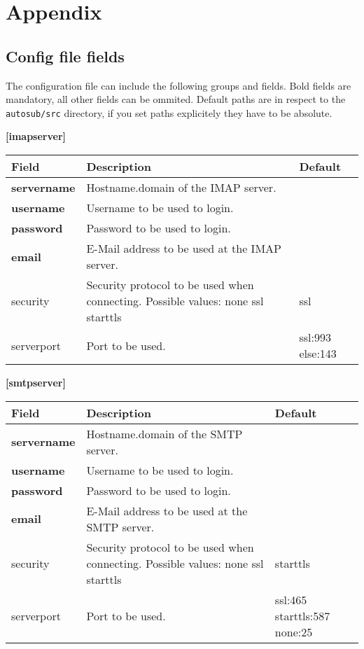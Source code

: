 \section{Appendix} \label{appendix}

\subsection{Config file fields} \label{app:config}
The configuration file can include the following groups and fields. Bold fields
are mandatory, all other fields can be ommited. Default paths are in respect to
the {\tt autosub/src} directory, if you set paths explicitely they have to be absolute.

{\bf [imapserver]}\\
\begin{tabular}{|p{2.5cm}|p{8cm}|p{2.5cm}|}
\hline
{\bf Field} & {\bf Description} & {\bf Default}\\
\hline
\hline
\textbf{servername} & Hostname.domain of the IMAP server. & ~\\
\hline
\textbf{username} & Username to be used to login. & ~ \\
\hline
\textbf{password} & Password to be used to login. & ~ \\
\hline
\textbf{email} & E-Mail address to be used at the IMAP server. & ~ \\
\hline
security & Security protocol to be used when connecting.
    Possible values: none ssl starttls & ssl \\
\hline
serverport & Port to be used. & ssl:993 else:143\\
\hline
\end{tabular}


{\bf [smtpserver]}\\
\begin{tabular}{|p{2.5cm}|p{8cm}|p{2.5cm}|}
\hline
{\bf Field} & {\bf Description} & {\bf Default}\\
\hline
\hline
\textbf{servername} & Hostname.domain of the SMTP server. & ~ \\
\hline
\textbf{username }& Username to be used to login. & ~ \\
\hline
\textbf{password} & Password to be used to login. & ~ \\
\hline
\textbf{email} & E-Mail address to be used at the SMTP server. & ~ \\
\hline
security & Security protocol to be used when connecting.
    Possible values: none ssl starttls & starttls\\
\hline
serverport & Port to be used. & ssl:465 starttls:587 none:25 \\
\hline
\end{tabular}

